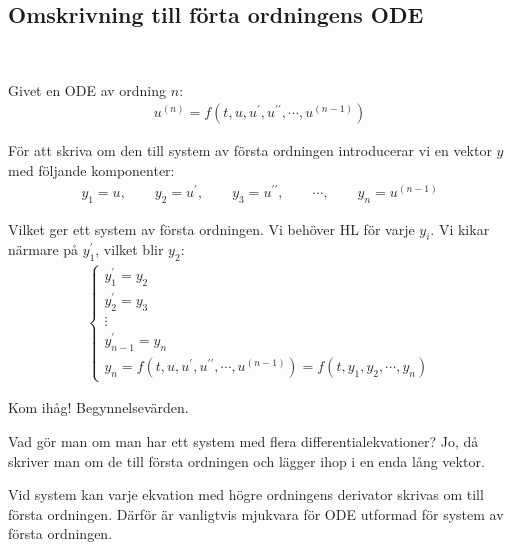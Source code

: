 \subsection{Omskrivning till förta ordningens ODE}\hfill\\
\par\bigskip
\noindent Givet en ODE av ordning $n$:
\begin{equation*}
  \begin{gathered}
    u^{(n)} = f(t, u, u^{\prime}, u^{\prime\prime},\cdots, u^{(n-1)})
  \end{gathered}
\end{equation*}
\par\bigskip
\noindent För att skriva om den till system av första ordningen introducerar vi en vektor $y$ med följande komponenter:
\begin{equation*}
  \begin{gathered}
    y_1 = u,\qquad y_2 = u^{\prime},\qquad y_3 = u^{\prime\prime},\qquad\cdots, \qquad y_n = u^{(n-1)}
  \end{gathered}
\end{equation*}
\par\bigskip
\noindent Vilket ger ett system av första ordningen. Vi behöver HL för varje $y_i$. Vi kikar närmare på $y_1^{\prime}$, vilket blir $y_2$:
\begin{equation*}
  \begin{gathered}
    \begin{cases*}
        y_1^{\prime} = y_2\\
        y_2^{\prime} = y_3\\
        \vdots\\
        y_{n-1}^{\prime} = y_n\\
        y_n = f(t,u, u^{\prime}, u^{\prime\prime},\cdots,u^{(n-1)}) = f(t,y_1, y_2,\cdots, y_n)
    \end{cases*}
  \end{gathered}
\end{equation*}
\par\bigskip
\noindent Kom ihåg! Begynnelsevärden.
\par\bigskip
\noindent Vad gör man om man har ett system med flera differentialekvationer? Jo, då skriver man om de till första ordningen och lägger ihop i en enda lång vektor.\par
\noindent Vid system kan varje ekvation med högre ordningens derivator skrivas om till första ordningen. Därför är vanligtvis mjukvara för ODE utformad för system av första ordningen.
\par\bigskip
